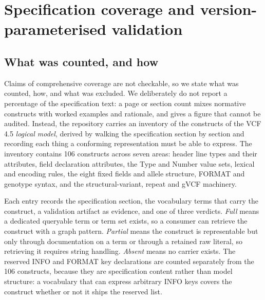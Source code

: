 \documentclass{ceurart}
\begin{document}
\section{Specification coverage and version-parameterised validation}
\label{sec:coverage}

\subsection{What was counted, and how}

Claims of comprehensive coverage are not checkable, so we state what was counted, how, and what was excluded. We deliberately do not report a percentage of the specification text: a page or section count mixes normative constructs with worked examples and rationale, and gives a figure that cannot be audited. Instead, the repository carries an inventory of the constructs of the VCF 4.5 \emph{logical model}, derived by walking the specification section by section and recording each thing a conforming representation must be able to express. The inventory contains 106 constructs across seven areas: header line types and their attributes, field declaration attributes, the Type and Number value sets, lexical and encoding rules, the eight fixed fields and allele structure, FORMAT and genotype syntax, and the structural-variant, repeat and gVCF machinery.

Each entry records the specification section, the vocabulary terms that carry the construct, a validation artifact as evidence, and one of three verdicts. \emph{Full} means a dedicated queryable term or term set exists, so a consumer can retrieve the construct with a graph pattern. \emph{Partial} means the construct is representable but only through documentation on a term or through a retained raw literal, so retrieving it requires string handling. \emph{Absent} means no carrier exists. The reserved INFO and FORMAT key declarations are counted separately from the 106 constructs, because they are specification content rather than model structure: a vocabulary that can express arbitrary INFO keys covers the construct whether or not it ships the reserved list.
\end{document}
